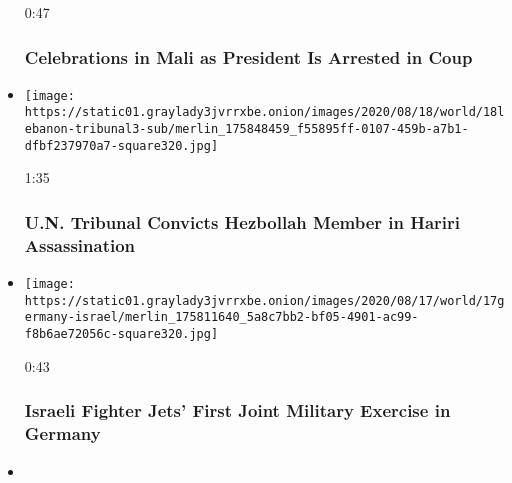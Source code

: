\begin{itemize}
  0:47

  \hypertarget{celebrations-in-mali-as-president-is-arrested-in-coup}{%
  \subsubsection{Celebrations in Mali as President Is Arrested in
  Coup}\label{celebrations-in-mali-as-president-is-arrested-in-coup}}
\item
  \href{https://www.nytimes3xbfgragh.onion/video/us/politics/100000007294649/hezbollah-member-guilty-hariri-assassination.html?action=click\&module=video-series-bar\&region=header\&pgtype=Article\&playlistId=video/world}{}

  \texttt{[image: https://static01.graylady3jvrrxbe.onion/images/2020/08/18/world/18lebanon-tribunal3-sub/merlin\_175848459\_f55895ff-0107-459b-a7b1-dfbf237970a7-square320.jpg]}

  1:35

  \hypertarget{un-tribunal-convicts-hezbollah-member-in-hariri-assassination}{%
  \subsubsection{U.N. Tribunal Convicts Hezbollah Member in Hariri
  Assassination}\label{un-tribunal-convicts-hezbollah-member-in-hariri-assassination}}
\item
  \href{https://www.nytimes3xbfgragh.onion/video/us/politics/100000007294367/israeli-fighter-jets-1st-joint-military-exercise-in-germany.html?action=click\&module=video-series-bar\&region=header\&pgtype=Article\&playlistId=video/world}{}

  \texttt{[image: https://static01.graylady3jvrrxbe.onion/images/2020/08/17/world/17germany-israel/merlin\_175811640\_5a8c7bb2-bf05-4901-ac99-f8b6ae72056c-square320.jpg]}

  0:43

  \hypertarget{israeli-fighter-jets-first-joint-military-exercise-in-germany}{%
  \subsubsection{Israeli Fighter Jets' First Joint Military Exercise in
  Germany}\label{israeli-fighter-jets-first-joint-military-exercise-in-germany}}
\item
  \href{https://www.nytimes3xbfgragh.onion/video/us/elections/100000007292203/new-zealand-delayed-election.html?action=click\&module=video-series-bar\&region=header\&pgtype=Article\&playlistId=video/world}{}


\end{itemize}
